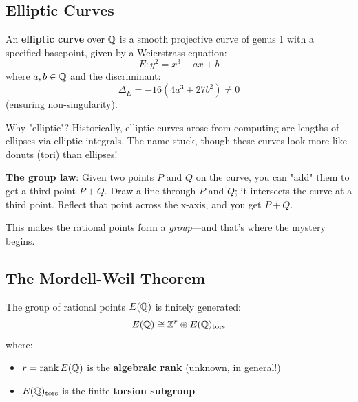 \subsection{Elliptic Curves}

\begin{defn}\label{def:elliptic-curve}
An \textbf{elliptic curve} over $\mathbb{Q}$ is a smooth projective curve of genus 1 with a specified basepoint, given by a Weierstrass equation:
\begin{equation}
E: y^2 = x^3 + ax + b
\end{equation}
where $a, b \in \mathbb{Q}$ and the discriminant:
\begin{equation}
\Delta_E = -16(4a^3 + 27b^2) \neq 0
\end{equation}
(ensuring non-singularity).
\end{defn}

\begin{intuitive}
Why "elliptic"? Historically, elliptic curves arose from computing arc lengths of ellipses via elliptic integrals. The name stuck, though these curves look more like donuts (tori) than ellipses!

\textbf{The group law}: Given two points $P$ and $Q$ on the curve, you can "add" them to get a third point $P + Q$. Draw a line through $P$ and $Q$; it intersects the curve at a third point. Reflect that point across the x-axis, and you get $P + Q$.

This makes the rational points form a \textit{group}—and that's where the mystery begins.
\end{intuitive}

\subsection{The Mordell-Weil Theorem}

\begin{theorem}\label{thm:mordell-weil}
The group of rational points $E(\mathbb{Q})$ is finitely generated:
\begin{equation}
E(\mathbb{Q}) \cong \mathbb{Z}^r \oplus E(\mathbb{Q})_{\text{tors}}
\end{equation}
where:
\begin{itemize}
\item $r = \rank E(\mathbb{Q})$ is the \textbf{algebraic rank} (unknown, in general!)
\item $E(\mathbb{Q})_{\text{tors}}$ is the finite \textbf{torsion subgroup}
\end{itemize}
\end{theorem}

